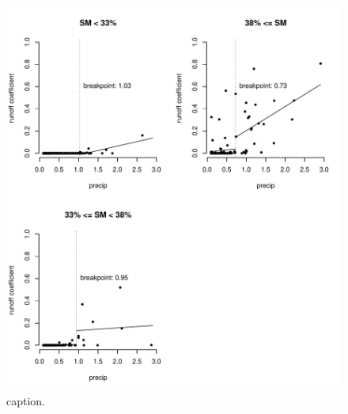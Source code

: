 \documentclass[12pt]{article}
\begin{document}
\begin{figure}
    \begin{center}
\includegraphics{runoff-precip_binned}
    \end{center}
    \caption{caption.\label{precip_binned}}
\end{figure}
\end{document}
